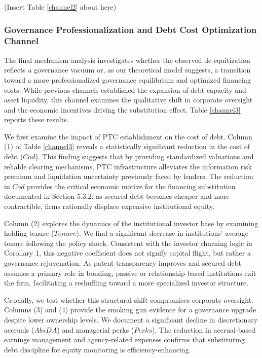 \documentclass[12pt,a4paper]{article}
\begin{document}
\begin{center}
    (Insert Table \ref{channel2} about here)
\end{center}

\subsubsection{Governance Professionalization and Debt Cost Optimization Channel}
The final mechanism analysis investigates whether the observed de-equitization reflects a governance vacuum or, as our theoretical model suggests, a transition toward a more professionalized governance equilibrium and optimized financing costs. While previous channels established the expansion of debt capacity and asset liquidity, this channel examines the qualitative shift in corporate oversight and the economic incentives driving the substitution effect. Table \ref{channel3} reports these results.

We first examine the impact of PTC establishment on the cost of debt. Column (1) of Table \ref{channel3} reveals a statistically significant reduction in the cost of debt ($Cod$). This finding suggests that by providing standardized valuations and reliable clearing mechanisms, PTC infrastructure alleviates the information risk premium and liquidation uncertainty previously faced by lenders. The reduction in $Cod$ provides the critical economic motive for the financing substitution documented in Section 5.3.2: as secured debt becomes cheaper and more contractible, firms rationally displace expensive institutional equity.

Column (2) explores the dynamics of the institutional investor base by examining holding tenure ($Tenure$). We find a significant decrease in institutions' average tenure following the policy shock. Consistent with the investor churning logic in Corollary 1, this negative coefficient does not signify capital flight, but rather a governance rejuvenation. As patent transparency improves and secured debt assumes a primary role in bonding, passive or relationship-based institutions exit the firm, facilitating a reshuffling toward a more specialized investor structure. 

Crucially, we test whether this structural shift compromises corporate oversight. Columns (3) and (4) provide the smoking gun evidence for a governance upgrade despite lower ownership levels. We document a significant decline in discretionary accruals ($AbsDA$) and managerial perks ($Perks$). The reduction in accrual-based earnings management and agency-related expenses confirms that substituting debt discipline for equity monitoring is efficiency-enhancing.
\end{document}
